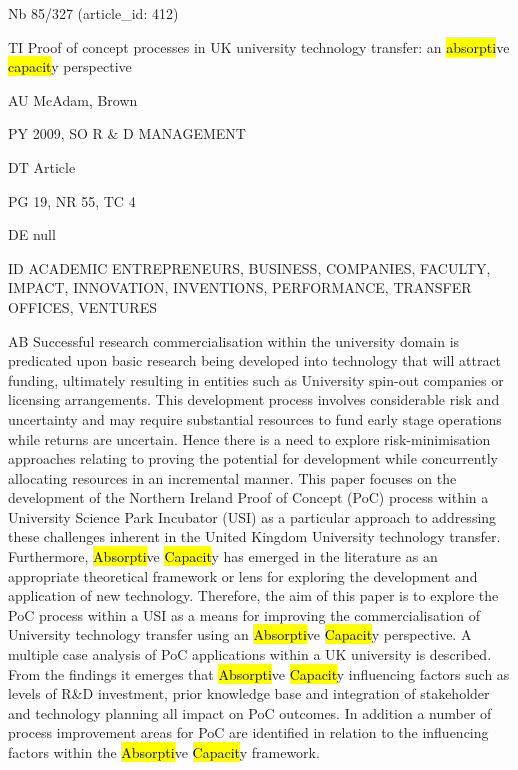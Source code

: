 \documentclass[a4paper]{article}
\begin{document}
\vspace*{-2cm}
Nb \tabto{0cm}85/327 (article\_id: 412)\par
TI \tabto{0cm}Proof of concept processes in UK university technology transfer: an \hl{absorpti}ve \hl{capacit}y perspective\par
AU \tabto{0cm}McAdam, Brown\par
PY \tabto{0cm}2009, SO R \& D MANAGEMENT\par
DT \tabto{0cm}Article\par
PG \tabto{0cm}19, NR 55, TC 4\par
DE \tabto{0cm}null\par
ID \tabto{0cm}ACADEMIC ENTREPRENEURS, BUSINESS, COMPANIES, FACULTY, IMPACT, INNOVATION, INVENTIONS, PERFORMANCE, TRANSFER OFFICES, VENTURES\par
AB \tabto{0cm}Successful research commercialisation within the university domain is predicated upon basic research being developed into technology that will attract funding, ultimately resulting in entities such as University spin-out companies or licensing arrangements. This development process involves considerable risk and uncertainty and may require substantial resources to fund early stage operations while returns are uncertain. Hence there is a need to explore risk-minimisation approaches relating to proving the potential for development while concurrently allocating resources in an incremental manner. This paper focuses on the development of the Northern Ireland Proof of Concept (PoC) process within a University Science Park Incubator (USI) as a particular approach to addressing these challenges inherent in the United Kingdom University technology transfer. Furthermore, \hl{Absorpti}ve \hl{Capacit}y has emerged in the literature as an appropriate theoretical framework or lens for exploring the development and application of new technology. Therefore, the aim of this paper is to explore the PoC process within a USI as a means for improving the commercialisation of University technology transfer using an \hl{Absorpti}ve \hl{Capacit}y perspective. A multiple case analysis of PoC applications within a UK university is described. From the findings it emerges that \hl{Absorpti}ve \hl{Capacit}y influencing factors such as levels of R\&D investment, prior knowledge base and integration of stakeholder and technology planning all impact on PoC outcomes. In addition a number of process improvement areas for PoC are identified in relation to the influencing factors within the \hl{Absorpti}ve \hl{Capacit}y framework.\par
\clearpage
\end{document}
